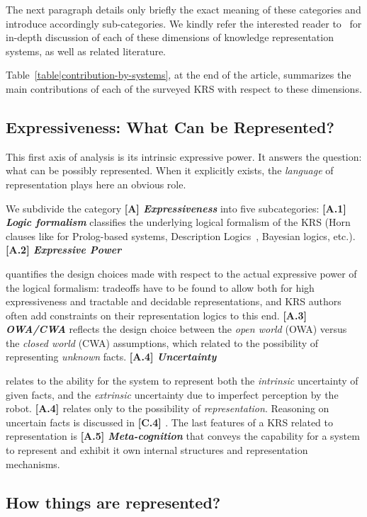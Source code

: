 \documentclass{IEEEtran}
\newcommand{\taxon}[2]{%
    \textbf{[#1] \emph{#2}}
}
\begin{document}
The next paragraph details only briefly the exact meaning of these categories
and introduce accordingly sub-categories. We kindly refer the interested reader
to~\cite{blabla} for in-depth discussion of each of these dimensions of
knowledge representation systems, as well as related literature.

Table~\ref{table|contribution-by-systems}, at the end of the article, summarizes
the main contributions of each of the surveyed KRS with respect to these
dimensions.

\subsection{Expressiveness: What Can be Represented?}
\label{sect|expressiveness}

This first axis of analysis is its intrinsic expressive power. It answers the
question: what can be possibly represented. When it explicitly exists, the
\emph{language} of representation plays here an obvious role.

We subdivide the category \taxon{A}{Expressiveness} into five subcategories:
\taxon{A.1}{Logic formalism} classifies the underlying logical formalism of the
KRS (Horn clauses like for Prolog-based systems, Description
Logics~\cite{Baader2008}, Bayesian logics, etc.). \taxon{A.2}{Expressive Power}
quantifies the design choices made with respect to the actual expressive power
of the logical formalism: tradeoffs have to be found to allow both for high
expressiveness and tractable and decidable representations, and KRS authors
often add constraints on their representation logics to this end.
\taxon{A.3}{OWA/CWA} reflects the design choice between the \emph{open world}
(OWA) versus the \emph{closed world} (CWA) assumptions, which related to the
possibility of representing \emph{unknown} facts. \taxon{A.4}{Uncertainty}
relates to the ability for the system to represent both the \emph{intrinsic}
uncertainty of given facts, and the \emph{extrinsic} uncertainty due to
imperfect perception by the robot. \taxon{A.4}{} relates only to the possibility
of \emph{representation}. Reasoning on uncertain facts is discussed in
\taxon{C.4}{}. The last features of a KRS related to representation is
\taxon{A.5}{Meta-cognition} that conveys the capability for a system to
represent and exhibit it own internal structures and representation mechanisms.

\subsection{How things are represented?}
\label{sect|higher-level-domain-representation}
\end{document}
